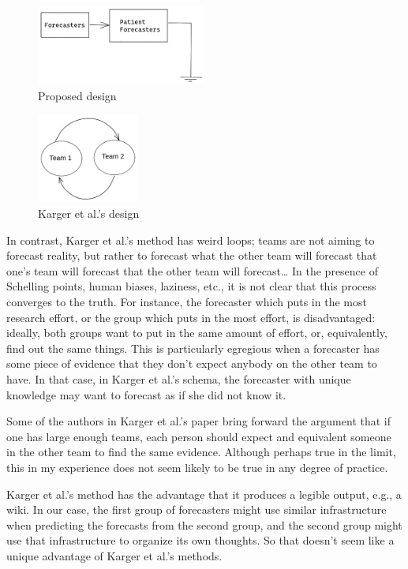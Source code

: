 \documentclass[]{article}
\begin{document}
\begin{figure}
\centering
\includegraphics[width=0.5\textwidth,height=\textheight]{diagrams/amplify-samotsvety-1.png}
\caption{Proposed design}
\end{figure}

\begin{figure}
\centering
\includegraphics[width=0.3\textwidth,height=\textheight]{diagrams/karger-method.png}
\caption{Karger et al.'s design}
\end{figure}

In contrast, Karger et al.'s method has weird loops; teams are not
aiming to forecast reality, but rather to forecast what the other team
will forecast that one's team will forecast that the other team will
forecast\ldots{} In the presence of Schelling points, human biases,
laziness, etc., it is not clear that this process converges to the
truth. For instance, the forecaster which puts in the most research
effort, or the group which puts in the most effort, is disadvantaged:
ideally, both groups want to put in the same amount of effort, or,
equivalently, find out the same things. This is particularly egregious
when a forecaster has some piece of evidence that they don't expect
anybody on the other team to have. In that case, in Karger et al.'s
schema, the forecaster with unique knowledge may want to forecast as if
she did not know it.

Some of the authors in Karger et al.'s paper bring forward the argument
that if one has large enough teams, each person should expect and
equivalent someone in the other team to find the same evidence. Although
perhaps true in the limit, this in my experience does not seem likely to
be true in any degree of practice.

Karger et al.'s method has the advantage that it produces a legible
output, e.g., a wiki. In our case, the first group of forecasters might
use similar infrastructure when predicting the forecasts from the second
group, and the second group might use that infrastructure to organize
its own thoughts. So that doesn't seem like a unique advantage of Karger
et al.'s methods.
\end{document}
